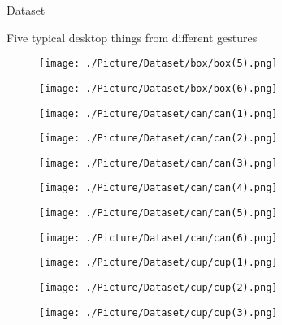 \documentclass[xcolor=table,compress,blue]{beamer}
\begin{document}
\begin{frame}{Dataset}
\begin{exampleblock}{Five typical desktop things from different gestures}
\begin{figure}[htpb]
\begin{minipage}[b]{0.65in}
			\end{minipage}
			\begin{minipage}[b]{0.65in}
				\centerline{ \texttt{[image: ./Picture/Dataset/box/box(5).png]} }
			\end{minipage}
			\begin{minipage}[b]{0.65in}
				\centerline{ \texttt{[image: ./Picture/Dataset/box/box(6).png]} }
			\end{minipage}
			\begin{minipage}[b]{0.65in}
				\centerline{ \texttt{[image: ./Picture/Dataset/can/can(1).png]} }
			\end{minipage}
			\begin{minipage}[b]{0.65in}
				\centerline{ \texttt{[image: ./Picture/Dataset/can/can(2).png]} }
			\end{minipage}
			\begin{minipage}[b]{0.65in}
				\centerline{ \texttt{[image: ./Picture/Dataset/can/can(3).png]} }
			\end{minipage}
			\begin{minipage}[b]{0.65in}
				\centerline{ \texttt{[image: ./Picture/Dataset/can/can(4).png]} }
			\end{minipage}
			\begin{minipage}[b]{0.65in}
				\centerline{ \texttt{[image: ./Picture/Dataset/can/can(5).png]} }
			\end{minipage}
			\begin{minipage}[b]{0.65in}
				\centerline{ \texttt{[image: ./Picture/Dataset/can/can(6).png]} }
			\end{minipage}
			\begin{minipage}[b]{0.65in}
				\centerline{ \texttt{[image: ./Picture/Dataset/cup/cup(1).png]} }
			\end{minipage}
			\begin{minipage}[b]{0.65in}
				\centerline{ \texttt{[image: ./Picture/Dataset/cup/cup(2).png]} }
			\end{minipage}
			\begin{minipage}[b]{0.65in}
				\centerline{ \texttt{[image: ./Picture/Dataset/cup/cup(3).png]} }
			\end{minipage}
			\begin{minipage}[b]{0.65in}

\end{minipage}
\end{figure}
\end{exampleblock}
\end{frame}
\end{document}
